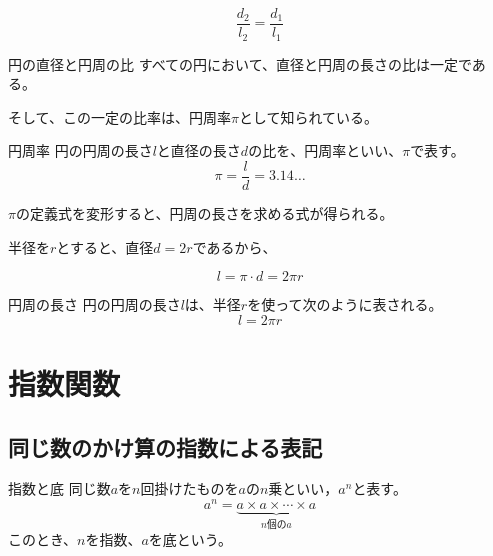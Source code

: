 \documentclass[../math-imaging]{subfiles}
\begin{document}
\begin{equation}
  \dfrac{d_{2}}{l_{2}} = \dfrac{d_{1}}{l_{1}}
\end{equation}

\begin{theorem}{円の直径と円周の比}
  すべての円において、直径と円周の長さの比は一定である。
\end{theorem}

そして、この一定の比率は、円周率$\pi$として知られている。

\begin{definition}{円周率}
  円の円周の長さ$l$と直径の長さ$d$の比を、円周率といい、$\pi$で表す。
  \LARGE
  \begin{equation}
    \pi = \dfrac{l}{d} = 3.14\ldots
  \end{equation}
\end{definition}

$\pi$の定義式を変形すると、円周の長さを求める式が得られる。

半径を$r$とすると、直径$d = 2r$であるから、

\begin{equation}
  l = \pi \cdot d = 2\pi r
\end{equation}

\begin{theorem}{円周の長さ}
  円の円周の長さ$l$は、半径$r$を使って次のように表される。
  \LARGE
  \begin{equation}
    l = 2\pi r
  \end{equation}
\end{theorem}

\section{指数関数}

\subsection{同じ数のかけ算の指数による表記}

\begin{definition}{指数と底}
  \newline
  同じ数$a$を$n$回掛けたものを$a$の$n$乗といい，$a^n$と表す。
  \LARGE
  \begin{equation}
    a^n = \underbrace{a \times a \times \cdots \times a}_{n\text{個の}a}
  \end{equation}
  \normalsize
  このとき、$n$を指数、$a$を底という。
\end{definition}
\end{document}
